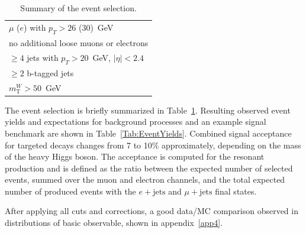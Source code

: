\begin{table}
  \centering
  \caption{Summary of the event selection.}
  \label{Tab:EventSelection}
  \begin{tabular}{l}
  \hline
  \hline
  $\mu$ ($e$) with $p_{T} > 26$ (30)~GeV  \\
  no additional loose muons or electrons  \\
  $\geqslant 4$ jets with $p_{T} > 20$~GeV, $|\eta| < 2.4$  \\
  $\geqslant 2$ b-tagged jets  \\
  $m_\text{T}^W > 50$~GeV \\
  \hline
  \hline
  \end{tabular}
\end{table}

The event selection is briefly summarized in Table~\ref{Tab:EventSelection}.
Resulting observed event yields and expectations for background processes and an example signal benchmark are shown in Table~\ref{Tab:EventYields}.
Combined signal acceptance for targeted decays changes from 7 to 10\% approximately, depending on the mass of the heavy Higgs boson.
The acceptance is computed for the resonant production and is defined as the ratio between the expected number of selected events, summed over the muon and electron channels, and the total expected number of produced events with the $e + \text{jets}$ and $\mu + \text{jets}$ final states.

After applying all cuts and corrections, a good data/MC comparison observed in distributions of basic observable, shown in appendix~\ref{app4}. 


